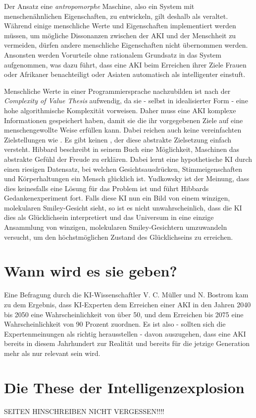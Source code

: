 Der Ansatz eine \emph{antropomorphe} Maschine, also ein System mit menschenähnlichen Eigenschaften, zu entwickeln, gilt deshalb als veraltet. Während einige menschliche Werte und Eigenschaften implementiert werden müssen, um mögliche Dissonanzen zwischen der AKI und der Menschheit zu vermeiden, dürfen andere menschliche Eigenschaften nicht übernommen werden. Ansonsten werden Vorurteile ohne rationalem Grundsatz in das System aufgenommen, was dazu führt, dass eine AKI beim Erreichen ihrer Ziele Frauen oder Afrikaner benachteiligt oder Asiaten automatisch als intelligenter einstuft.

Menschliche Werte in einer Programmiersprache nachzubilden ist nach der \emph{Complexity of Value Thesis} aufwendig, da sie - selbst in idealisierter Form - eine hohe algorithmische Komplexität vorweisen. Daher muss eine AKI komplexe Informationen gespeichert haben, damit sie die ihr vorgegebenen Ziele auf eine menschengewollte Weise erfüllen kann. Dabei reichen auch keine vereinfachten Zielstellungen wie . Es gibt keinen , der diese abstrakte Zielsetzung einfach versteht. Hibbard beschreibt in seinem Buch eine Möglichkeit, Maschinen das abstrakte Gefühl der Freude zu erklären. Dabei lernt eine hypothetische KI durch einen riesigen Datensatz, bei welchen Gesichtsausdrücken, Stimmeigenschaften und Körperhaltungen ein Mensch glücklich ist. Yudkowsky ist der Meinung, dass dies keinesfalls eine Lösung für das Problem ist und führt Hibbards Gedankenexperiment fort. Falls diese KI nun ein Bild von einem winzigen, molekularen Smiley-Gesicht sieht, so ist es nicht unwahrscheinlich, dass die KI dies als Glücklichsein interpretiert und das Universum in eine einzige Ansammlung von winzigen, molekularen Smiley-Gesichtern umzuwandeln versucht, um den höchstmöglichen Zustand des Glücklichseins zu erreichen. 

\section{Wann wird es sie geben?}
Eine Befragung durch die KI-Wissenschaftler V. C. Müller und N. Bostrom kam zu dem Ergebnis, dass KI-Experten dem Erreichen einer AKI in den Jahren 2040 bis 2050 eine Wahrscheinlichkeit von über 50, und dem Erreichen bis 2075 eine Wahrscheinlichkeit von 90 Prozent zuordnen.  Es ist also - sollten sich die Expertenmeinungen als richtig herausstellen - davon auszugehen, dass eine AKI bereits in diesem Jahrhundert zur Realität und bereits für die jetzige Generation mehr als nur relevant sein wird. 

\section{Die These der Intelligenzexplosion}
SEITEN HINSCHREIBEN NICHT VERGESSEN!!!!
